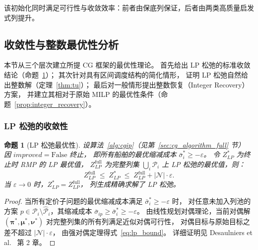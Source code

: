 \documentclass[UTF8, a4paper, 12pt]{ctexart}
\theoremstyle{plain}
\newtheorem{proposition}{命题}
\theoremstyle{definition}
\theoremstyle{remark}
\begin{document}
\noindent
该初始化同时满足可行性与收敛效率：前者由保底列保证，后者由两类高质量启发式列提升。

\subsection{收敛性与整数最优性分析}
\label{sec:cg_convergence}

本节从三个层次建立所提 CG 框架的最优性理论。
首先给出 LP 松弛的标准收敛结论（命题~\ref{prop:lp}）；
其次针对具有区间调度结构的简化情形，
证明 LP 松弛自然给出整数解（定理~\ref{thm:tu}）；
最后对一般情形提出整数恢复（Integer Recovery）方案，
并建立其相对于原始 MILP 的最优性条件（命题~\ref{prop:integer_recovery}）。

\subsubsection{LP 松弛的收敛性}

\begin{proposition}[LP 松弛最优性]
\label{prop:lp}
设算法~\ref{alg:cgip}（见第~\ref{sec:cg_algorithm_full} 节）
因 $\textit{improved} = \mathrm{False}$ 终止，
即所有船舶的最优缩减成本 $\bar{\sigma}_i^* \ge -\varepsilon$。
令 $Z_{LP}^*$ 为终止时 RMP 的 LP 最优值，
$Z_{LP}^{\text{full}}$ 为完整列集 $\bigcup_i \mathcal{P}_i$ 上 LP 松弛的最优值，则：
\begin{equation}
  Z_{LP}^{\text{full}} \;\le\; Z_{LP}^* \;\le\; Z_{LP}^{\text{full}} + |\mathcal{N}|\cdot\varepsilon.
  \label{eq:lp_bound}
\end{equation}
当 $\varepsilon\to 0$ 时，$Z_{LP}^* = Z_{LP}^{\text{full}}$，
列生成精确求解了 LP 松弛。
\end{proposition}

\begin{proof}
当所有定价子问题的最优缩减成本满足 $\bar{\sigma}_i^*\ge -\varepsilon$ 时，
对任意未加入列池的方案 $p\in\mathcal{P}_i\setminus\hat{\mathcal{P}}_i$，其缩减成本
$\bar{\sigma}_{ip}\ge\bar{\sigma}_i^*\ge -\varepsilon$。
由线性规划对偶理论，当前对偶解
$(\boldsymbol{\pi}^*,\boldsymbol{\mu}^*,\boldsymbol{\nu}^*)$
对完整列集的所有列满足近似对偶可行性，
对偶目标与原始目标之差不超过 $|\mathcal{N}|\cdot\varepsilon$，
由强对偶定理得式~\eqref{eq:lp_bound}。
详细证明见 Desaulniers et al.~\cite{Desaulniers2005} 第 2 章。
\end{proof}
\end{document}
